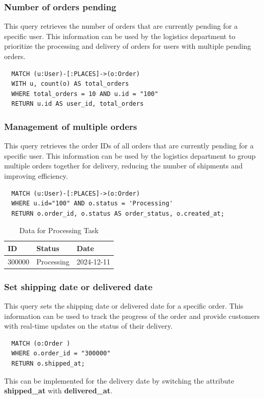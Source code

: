 \documentclass[a4paper,12pt]{article}
\begin{document}
\subsubsection{Number of orders pending}
This query retrieves the number of orders that are currently pending for a specific user. This information can be used by the logistics department to prioritize the processing and delivery of orders for users with multiple pending orders.
\begin{verbatim}
  MATCH (u:User)-[:PLACES]->(o:Order)
  WITH u, count(o) AS total_orders
  WHERE total_orders = 10 AND u.id = "100"
  RETURN u.id AS user_id, total_orders
\end{verbatim}

\subsubsection{Management of multiple orders}
This query retrieves the order IDs of all orders that are currently pending for a specific user. This information can be used by the logistics department to group multiple orders together for delivery, reducing the number of shipments and improving efficiency.
\begin{verbatim}
  MATCH (u:User)-[:PLACES]->(o:Order)
  WHERE u.id="100" AND o.status = 'Processing'  
  RETURN o.order_id, o.status AS order_status, o.created_at;

\end{verbatim}
  \begin{table}[h!]
    \centering
    \caption{Data for Processing Task}
    \label{tab:processing_data}
    \begin{tabular}{l l l}
        \toprule
        \textbf{ID} & \textbf{Status} & \textbf{Date} \\
        \midrule
        300000 & Processing & 2024-12-11 \\
        \bottomrule
    \end{tabular}
\end{table}

\subsubsection{Set shipping date or delivered date}
This query sets the shipping date or delivered date for a specific order. This information can be used to track the progress of the order and provide customers with real-time updates on the status of their delivery.
\begin{verbatim}
  MATCH (o:Order ) 
  WHERE o.order_id = "300000"
  RETURN o.shipped_at;
\end{verbatim}
This can be implemented for the delivery date by switching the attribute \textbf{shipped\_at} with \textbf{delivered\_at}.
\end{document}

